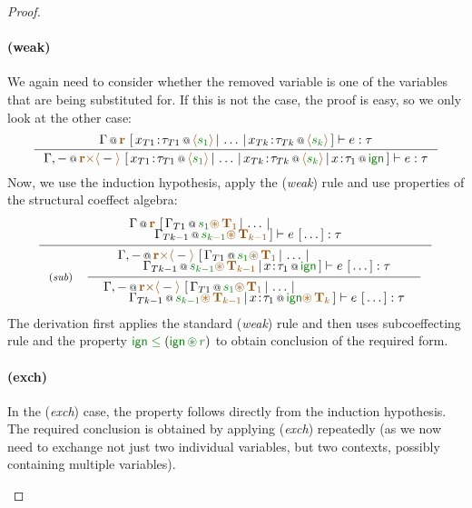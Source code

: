 \begin{proof}
\begin{itemize}
\paragraph{(weak)} We again need to consider whether the removed variable is 
one of the variables that are being substituted for. If this is not the case,
the proof is easy, so we only look at the other case:
\[
\inference
  {\coctx{\Gamma}{ \aclrd{\textbf{r}} }~
   [\,\coctx{x_{T1}\!:\!\tau_{T1}}{\alift{\cclrd{s_1}}} \,|\, \ldots \,|\, \coctx{x_{Tk}\!:\!\tau_{Tk}}{\alift{\cclrd{s_k}}}\,]
   \vdash e : \tau}
  {\coctx{\Gamma, -}{\aclrd{\textbf{r}} \atimes \alift{ - }}~
   [\,\coctx{x_{T1}\!:\!\tau_{T1}}{\alift{\cclrd{s_1}}} \,|\, \ldots \,|\, \coctx{x_{Tk}\!:\!\tau_{Tk}}{\alift{\cclrd{s_k}}}\,|\,\coctx{x\!:\!\tau_1}{\czero}\,]
   \vdash e : \tau} 
\]
Now, we use the induction hypothesis, apply the (\emph{weak}) rule and use properties of the
structural coeffect algebra:
\[
\inference
  {{ \begin{array}{l}
    \coctx{\Gamma}{ \aclrd{\textbf{r}} }~
    [\,\coctx{\Gamma_{T1}}{\cclrd{s_1}\aseq\,\aclrd{\textbf{T}_1}} \,|\, \ldots \,|\, 
     \\[-0.35em] \qquad
     \coctx{\Gamma_{Tk-1}}{\cclrd{s_{k-1}}\aseq\,\aclrd{\textbf{T}_{k-1}}}\,]
   \vdash e~[\,\ldots\,] : \tau 
   \end{array} }}
{\tyrule{sub}
 {{\begin{array}{l}
   \coctx{\Gamma, -}{\aclrd{\textbf{r}} \atimes \alift{ - }}~
   [\,\coctx{\Gamma_{T1}}{\cclrd{s_1}\aseq\,\aclrd{\textbf{T}_1}} \,|\, \ldots \,|\, 
    \\[-0.35em] \qquad
    \coctx{\Gamma_{Tk-1}}{\cclrd{s_{k-1}}\aseq\,\aclrd{\textbf{T}_{k-1}}}
      \,|\,\coctx{x\!:\!\tau_1}{\czero}\,]
   \vdash e~[\,\ldots\,] : \tau
   \end{array} }} 
 {{\begin{array}{l}
   \coctx{\Gamma, -}{\aclrd{\textbf{r}} \atimes \alift{ - }}~
   [\,\coctx{\Gamma_{T1}}{\cclrd{s_1}\aseq\,\aclrd{\textbf{T}_1}} \,|\, \ldots \,|\, 
    \\[-0.35em] \qquad
    \coctx{\Gamma_{Tk-1}}{\cclrd{s_{k-1}}\aseq\,\aclrd{\textbf{T}_{k-1}}}
      \,|\,\coctx{x\!:\!\tau_1}{\czero \aseq\,\aclrd{\textbf{T}_k} }\,]
   \vdash e~[\,\ldots\,] : \tau
   \end{array} }}  }
\]
The derivation first applies the standard (\emph{weak}) rule and then uses subcoeffecting
rule and the property $\czero\;\cleq\;(\czero\,\cseq\,\cclrd{r})$ to obtain conclusion of the required form.

\paragraph{(exch)} In the (\emph{exch}) case, the property follows directly from the 
induction hypothesis. The required conclusion is obtained by applying (\emph{exch}) 
repeatedly (as we now need to exchange not just two individual variables, but two 
contexts, possibly containing multiple variables).

\end{itemize}
\end{proof}



